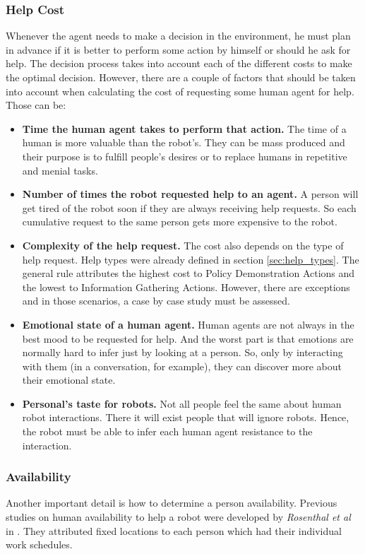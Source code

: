 \subsubsection{Help Cost}
\label{sec:help_cost}

Whenever the agent needs to make a decision in the environment, he must plan in
advance if it is better to perform some action by himself or should he ask for
help. The decision process takes into account each of the different costs to
make the optimal decision.
However, there are a couple of factors that should be taken into account when
calculating the cost of requesting some human agent for help. Those can be:
\begin{itemize}
  \item \textbf{Time the human agent takes to perform that action.} The time of
  a human is more valuable than the robot's. They can be mass produced and their
  purpose is to fulfill people's desires or to replace humans in repetitive
  and menial tasks.
  \item \textbf{Number of times the robot requested help to an agent.} A person
  will get tired of the robot soon if they are always receiving help requests.
  So each cumulative request to the same person gets more expensive to the
  robot.
  \item \textbf{Complexity of the help request.} The cost also depends on the
  type of help request. Help types were already defined in section
  \ref{sec:help_types}. The general rule attributes the highest cost to Policy
  Demonstration Actions and the lowest to Information Gathering Actions.
  However, there are exceptions and in those scenarios, a case by case study
  must be assessed.
  \item \textbf{Emotional state of a human agent.} Human agents are not always
  in the best mood to be requested for help. And the worst part is that emotions
  are normally hard to infer just by looking at a person. So, only by
  interacting with them (in a conversation, for example), they can discover more
  about their emotional state.
  \item \textbf{Personal's taste for robots.} Not all people feel the same about
  human robot interactions. There it will exist people that will ignore robots.
  Hence, the robot must be able to infer each human agent resistance to the
  interaction.
\end{itemize}

\subsubsection{Availability}
Another important detail is how to determine a person availability. Previous
studies on human availability to help a robot were developed by
\textit{Rosenthal et al} in \cite{rosenthal2012someone}.
They attributed fixed locations to each person which had their individual work
schedules.

